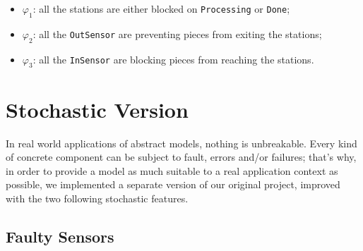 \documentclass[a4paper]{article}
\begin{document}
    \begin{itemize}
        \item \(\varphi_1\): all the stations are either blocked on \texttt{Processing} or \texttt{Done};
        \item \(\varphi_2\): all the \texttt{OutSensor} are preventing pieces from exiting the stations;
        \item \(\varphi_3\): all the \texttt{InSensor} are blocking pieces from reaching the stations.
    \end{itemize}

    \section{Stochastic Version}

    In real world applications of abstract models, nothing is unbreakable. Every kind of concrete component can be subject to fault, errors and/or failures; that's why, in order to provide a model as much suitable to a real application context as possible, we implemented a separate version of our original project, improved with the two following stochastic features.

    \subsection{Faulty Sensors}
\end{document}
